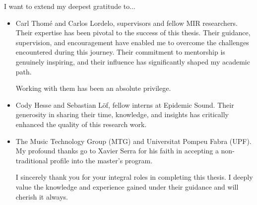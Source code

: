 

\begin{acknowledgement}

I want to extend my deepest gratitude to...

\begin{itemize}
\item Carl Thomé and Carlos Lordelo, supervisors and fellow MIR researchers. Their expertise has been pivotal to the success of this thesis. Their guidance, supervision, and encouragement have enabled me to overcome the challenges encountered during this journey. Their commitment to mentorship is genuinely inspiring, and their influence has significantly shaped my academic path. 

Working with them has been an absolute privilege.

\vspace*{3mm}
\item Cody Hesse and Sebastian Löf, fellow interns at Epidemic Sound. Their generosity in sharing their time, knowledge, and insights has critically enhanced the quality of this research work.

\vspace*{3mm}
\item The Music Technology Group (MTG) and Universitat Pompeu Fabra (UPF). My profound thanks go to Xavier Serra for his faith in accepting a non-traditional profile into the master's program.

\vspace*{3mm}

I sincerely thank you for your integral roles in completing this thesis. I deeply value the knowledge and experience gained under their guidance and will cherish it always.

\vspace*{3mm}
\end{itemize}

\newpage
\end{acknowledgement}